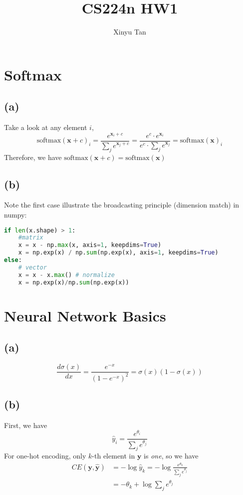 \documentclass[12pt]{article}
\begin{document}
\title{CS224n HW1}
\author{Xinyu Tan}
\maketitle

\section {Softmax}
\subsection*{(a)}
Take a look at any element $i$, 
$$
\text{softmax}(\bm x + c)_i = \frac{e^{\bm x_i + c}}{\sum_{j} e^ {\bm x_j + c}} = \frac{e^c \cdot e^{\bm x_i}}{e^c \cdot \sum_j e^{\bm x_j}} = \text{softmax}(\bm x )_i 
$$
Therefore, we have $\text{softmax}(\bm x + c) = \text{softmax}(\bm x)$

\subsection*{(b)}
Note the first case illustrate the broadcasting principle (dimension match) in numpy:
\begin{lstlisting}[language=Python]
if len(x.shape) > 1:
	#matrix
	x = x - np.max(x, axis=1, keepdims=True)
	x = np.exp(x) / np.sum(np.exp(x), axis=1, keepdims=True)
else:
	# vector
	x = x - x.max() # normalize
	x = np.exp(x)/np.sum(np.exp(x))
\end{lstlisting}


\section{Neural Network Basics}
\subsection*{(a)}
$$
\frac{d \sigma (x)}{dx} = \frac{e^{-x}}{(1-e^{-x})^2} = \sigma(x) (1 - \sigma(x))
$$

\subsection*{(b)}
First, we have
	$$\hat y_i = \frac{e^{\theta_i}}{\sum_j e^{\theta_j}}$$
For one-hot encoding, only $k$-th element in $\bm y$ is \emph{one}, so we have
\begin{align*}
CE(\bm y, \bm {\hat y}) &= - \log \hat y_k = - \log \frac{e^{\theta_k}}{\sum_j e^{\theta_j}} \\
				&= - \theta_k + \log \sum_j e^{\theta_j}
\end{align*}
\end{document}
